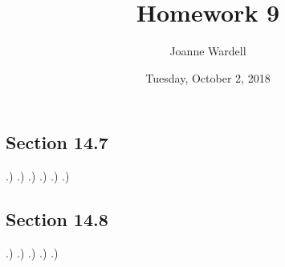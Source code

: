 \documentclass[12pt]{article}
\title{\vspace{-2.0cm}Homework 9}
\author{Joanne Wardell}
\date{Tuesday, October 2, 2018}
\begin{document}
\maketitle

\subsection*{Section 14.7}
.)
.)
.)
.)
.)
.)


\subsection*{Section 14.8}
.)
.)
.)
.)
.)
\end{document}
